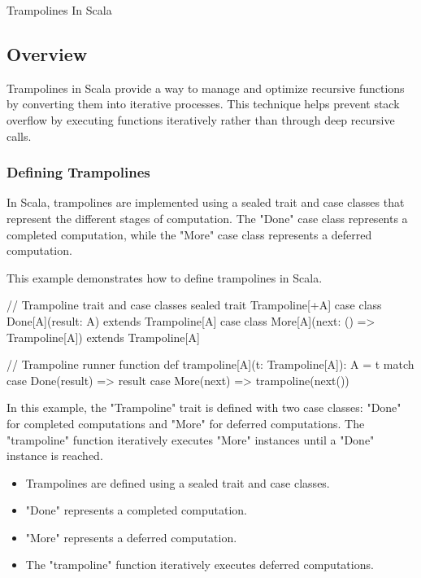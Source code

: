 \begin{notes}{Trampolines In Scala}
    \subsection*{Overview}

    Trampolines in Scala provide a way to manage and optimize recursive functions by converting them into iterative processes. This technique helps prevent stack overflow by executing functions 
    iteratively rather than through deep recursive calls.
    
    \subsubsection*{Defining Trampolines}
    
    In Scala, trampolines are implemented using a sealed trait and case classes that represent the different stages of computation. The "Done" case class represents a completed computation, while the 
    "More" case class represents a deferred computation.
    
    \begin{highlight}
    
        This example demonstrates how to define trampolines in Scala.
    
    \begin{code}[Scala]
    // Trampoline trait and case classes
    sealed trait Trampoline[+A]
    case class Done[A](result: A) extends Trampoline[A]
    case class More[A](next: () => Trampoline[A]) extends Trampoline[A]
    
    // Trampoline runner function
    def trampoline[A](t: Trampoline[A]): A = t match {
        case Done(result) => result
        case More(next) => trampoline(next())
    }
    \end{code}
    
        In this example, the "Trampoline" trait is defined with two case classes: "Done" for completed computations and "More" for deferred computations. The "trampoline" function iteratively executes 
        "More" instances until a "Done" instance is reached.
    
        \begin{itemize}
            \item Trampolines are defined using a sealed trait and case classes.
            \item "Done" represents a completed computation.
            \item "More" represents a deferred computation.
            \item The "trampoline" function iteratively executes deferred computations.
        \end{itemize}
    

\end{highlight}
\end{notes}
